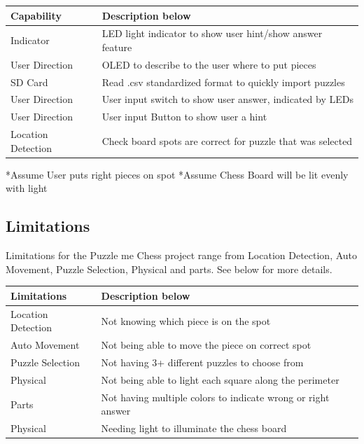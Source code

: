 \documentclass[11pt]{article}
\begin{document}
\begin{center}
    \begin{tabular}{| l | l |}
    \hline
    Capability  & Description below\\ \hline
    Indicator &  LED light indicator to show user hint/show answer feature \\ \hline
    User Direction & OLED to describe to the user where to put pieces \\ \hline 
    SD Card & Read .csv standardized format to quickly import puzzles \\ \hline
    User Direction & User input switch to show user answer, indicated by LEDs \\ \hline
    User Direction & User input Button to show user a hint \\ \hline
    Location Detection & Check board spots are correct for puzzle that was selected \\ \hline
    \end{tabular}
\end{center}
 *Assume User puts right pieces on spot 
 \newline
 *Assume Chess Board will be lit evenly with light  
\subsection{Limitations}
Limitations for the Puzzle me Chess project range from Location Detection, Auto Movement, Puzzle Selection, Physical and parts. See below for more details.

\begin{center}
    \begin{tabular}{| l | l |}
    \hline
    Limitations  & Description below\\ \hline
    Location Detection & Not knowing which piece is on the spot \\ \hline
    Auto Movement & Not being able to move the piece on correct spot \\ \hline 
    Puzzle Selection & Not having 3+ different puzzles to choose from  \\ \hline
    Physical & Not being able to light each square along the perimeter  \\ \hline
    Parts & Not having multiple colors to indicate wrong or right answer \\ \hline
    Physical & Needing light to illuminate  the chess board \\ \hline
    \end{tabular}
\end{center}
\end{document}
